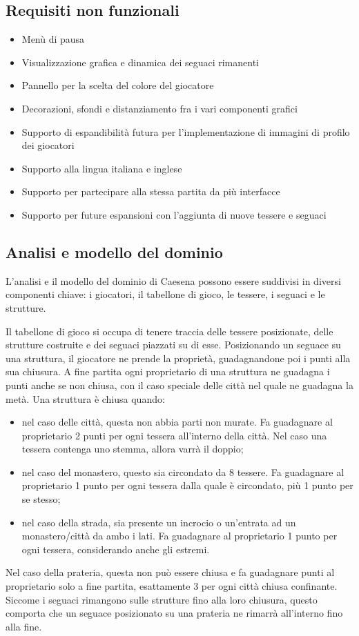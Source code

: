 \subsection*{Requisiti non funzionali}
\begin{itemize}
\item Menù di pausa
\item Visualizzazione grafica e dinamica dei seguaci rimanenti
\item Pannello per la scelta del colore del giocatore
\item Decorazioni, sfondi e distanziamento fra i vari componenti grafici
\item Supporto di espandibilità futura per l'implementazione di immagini di profilo dei giocatori
\item Supporto alla lingua italiana e inglese
\item Supporto per partecipare alla stessa partita da più interfacce
\item Supporto per future espansioni con l'aggiunta di nuove tessere e seguaci
\end{itemize}

\subsection{Analisi e modello del dominio}
L'analisi e il modello del dominio di Caesena possono essere suddivisi in diversi componenti chiave: i giocatori, il tabellone di gioco, le tessere, i seguaci e le strutture.
\medskip

Il tabellone di gioco si occupa di tenere traccia delle tessere posizionate, delle strutture costruite e dei seguaci piazzati su di esse. Posizionando un seguace su una struttura, il giocatore ne prende la proprietà, guadagnandone poi i punti alla sua chiusura. A fine partita ogni proprietario di una struttura ne guadagna i punti anche se non chiusa, con il caso speciale delle città nel quale ne guadagna la metà. Una struttura è chiusa quando:
\begin{itemize}
    \item nel caso delle città, questa non abbia parti non murate. Fa guadagnare al proprietario 2 punti per ogni tessera all'interno della città. Nel caso una tessera contenga uno stemma, allora varrà il doppio;
    \item nel caso del monastero, questo sia circondato da 8 tessere. Fa guadagnare al proprietario 1 punto per ogni tessera dalla quale è circondato, più 1 punto per se stesso;
    \item nel caso della strada, sia presente un incrocio o un'entrata ad un monastero/città da ambo i lati. Fa guadagnare al proprietario 1 punto per ogni tessera, considerando anche gli estremi.
\end{itemize}
Nel caso della prateria, questa non può essere chiusa e fa guadagnare punti al proprietario solo a fine partita, esattamente 3 per ogni città chiusa confinante. Siccome i seguaci rimangono sulle strutture fino alla loro chiusura, questo comporta che un seguace posizionato su una prateria ne rimarrà all'interno fino alla fine.
\medskip

